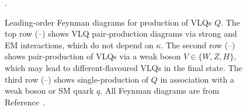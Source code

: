 \begin{figure}[t]
  \caption{Leading-order Feynman diagrams for production of VLQs $Q$.  The top row (\protect{}--\protect{}) shows VLQ pair-production diagrams via strong and EM interactions, which do not depend on $\kappa$.  The second row (\protect{}--\protect{}) shows pair-production of VLQs via a weak boson $V \in \{W,Z,H\}$, which may lead to different-flavoured VLQs in the final state. The third row (\protect{}--\protect{}) shows single-production of $Q$ in association with a weak boson or SM quark $q$. All Feynman diagrams are from Reference~\cite{VLQ_contur}.}.
\label{fig:feyndiags}
\end{figure}

